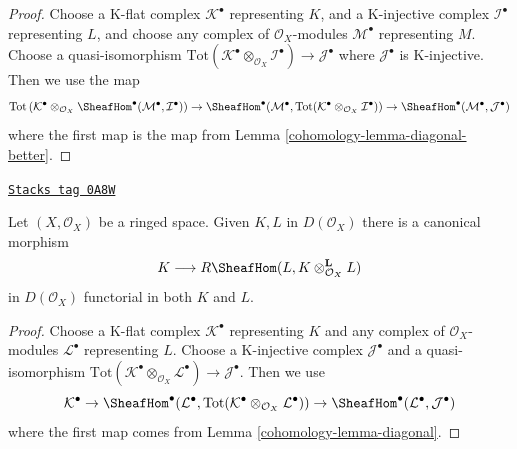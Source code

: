 \begin{proof}

Choose a K-flat complex $\mathcal{K}^\bullet$ representing $K$,
and a K-injective complex $\mathcal{I}^\bullet$ representing $L$, and
choose any complex of $\mathcal{O}_X$-modules $\mathcal{M}^\bullet$
representing $M$. Choose a quasi-isomorphism
$\text{Tot}(\mathcal{K}^\bullet \otimes_{\mathcal{O}_X} \mathcal{I}^\bullet)
\to \mathcal{J}^\bullet$
where $\mathcal{J}^\bullet$ is K-injective. Then we use the map
$$
\text{Tot}\left(
\mathcal{K}^\bullet \otimes_{\mathcal{O}_X}
\SheafHom^\bullet(\mathcal{M}^\bullet, \mathcal{I}^\bullet)
\right)
\to
\SheafHom^\bullet(\mathcal{M}^\bullet,
\text{Tot}(\mathcal{K}^\bullet \otimes_{\mathcal{O}_X} \mathcal{I}^\bullet))
\to
\SheafHom^\bullet(\mathcal{M}^\bullet, \mathcal{J}^\bullet)
$$
where the first map is the map from Lemma \ref{cohomology-lemma-diagonal-better}.
\end{proof}

\begin{lemma}
\label{cohomology-lemma-internal-hom-diagonal}
\href{https://stacks.math.columbia.edu/tag/0A8W}{\texttt{Stacks tag 0A8W}}

Let $(X, \mathcal{O}_X)$ be a ringed space. Given $K, L$ in $D(\mathcal{O}_X)$
there is a canonical morphism
$$
K \longrightarrow R\SheafHom(L, K \otimes_{\mathcal{O}_X}^\mathbf{L} L)
$$
in $D(\mathcal{O}_X)$ functorial in both $K$ and $L$.
\end{lemma}

\begin{proof}

Choose a K-flat complex $\mathcal{K}^\bullet$ representing $K$
and any complex of $\mathcal{O}_X$-modules $\mathcal{L}^\bullet$
representing $L$. Choose a K-injective complex $\mathcal{J}^\bullet$
and a quasi-isomorphism
$\text{Tot}(\mathcal{K}^\bullet \otimes_{\mathcal{O}_X} \mathcal{L}^\bullet)
\to \mathcal{J}^\bullet$. Then we use
$$
\mathcal{K}^\bullet \to
\SheafHom^\bullet(\mathcal{L}^\bullet,
\text{Tot}(\mathcal{K}^\bullet \otimes_{\mathcal{O}_X} \mathcal{L}^\bullet))
\to
\SheafHom^\bullet(\mathcal{L}^\bullet, \mathcal{J}^\bullet)
$$
where the first map comes from Lemma \ref{cohomology-lemma-diagonal}.
\end{proof}

